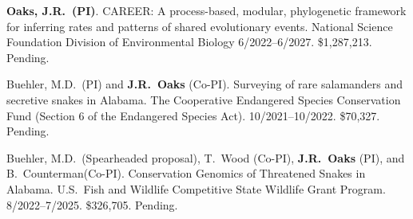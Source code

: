 \myHangIndent
\textbf{Oaks, J.R.\ (PI)}.
CAREER: A process-based, modular, phylogenetic framework for inferring rates
and patterns of shared evolutionary events.
National Science Foundation Division of Environmental Biology
6/2022--6/2027.
\$1,287,213.
Pending.

\myHangIndent
\phdsymbol{}Buehler, M.D.\ (PI)
and
\textbf{J.R.\ Oaks} (Co-PI).
Surveying of rare salamanders and secretive snakes in Alabama.
The Cooperative Endangered Species Conservation Fund (Section 6 of the
Endangered Species Act).
10/2021--10/2022.
\$70,327.
Pending.

\myHangIndent
\phdsymbol{}Buehler, M.D.\ (Spearheaded proposal),
T.\ Wood (Co-PI),
\textbf{J.R.\ Oaks} (PI),
and
B.\ Counterman(Co-PI).
Conservation Genomics of Threatened Snakes in Alabama.
U.S.\ Fish and Wildlife Competitive State Wildlife Grant Program.
8/2022--7/2025.
\$326,705.
Pending.
